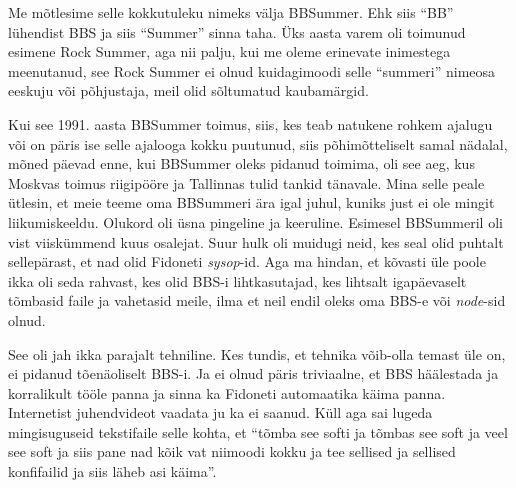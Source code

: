 Me mõtlesime selle kokkutuleku nimeks välja BBSummer. Ehk siis 
\enquote{BB} lühendist BBS ja siis \enquote{Summer} sinna taha. Üks aasta varem 
oli toimunud esimene Rock Summer, aga nii palju, kui me oleme erinevate inimestega 
meenutanud, see Rock Summer ei olnud kuidagimoodi selle \enquote{summeri} nimeosa 
eeskuju või põhjustaja, meil olid sõltumatud kaubamärgid. 

Kui see 1991. aasta BBSummer toimus, 
 siis, kes teab natukene rohkem ajalugu või 
on päris ise selle ajalooga kokku puutunud, siis põhimõtteliselt samal 
nädalal,  mõned päevad enne, kui BBSummer oleks pidanud toimima, oli see aeg, kus 
Moskvas toimus riigipööre ja Tallinnas tulid tankid tänavale. Mina selle peale ütlesin, et  meie teeme 
oma BBSummeri ära igal juhul, kuniks just ei ole mingit 
liikumiskeeldu. Olukord oli üsna pingeline ja keeruline. Esimesel BBSummeril 
oli vist viiskümmend kuus osalejat. Suur 
hulk oli muidugi neid, kes seal olid puhtalt  sellepärast, et nad olid Fidoneti 
\emph{sysop}-id. Aga ma hindan, et kõvasti üle poole ikka oli seda rahvast, kes  
olid BBS-i lihtkasutajad, kes lihtsalt igapäevaselt tõmbasid faile ja 
vahetasid meile, ilma et neil endil oleks oma BBS-e või \emph{node}-sid olnud.


See oli jah ikka parajalt tehniline. Kes tundis, et tehnika võib-olla temast 
üle on, ei pidanud tõenäoliselt BBS-i. Ja ei olnud päris triviaalne, et BBS 
häälestada ja korralikult tööle panna ja  sinna ka Fidoneti 
automaatika käima panna. Internetist juhendvideot vaadata ju ka ei saanud. Küll 
aga sai lugeda mingisuguseid tekstifaile  selle kohta, et \enquote{tõmba see 
softi ja tõmbas see soft ja veel see soft ja siis pane nad kõik vat niimoodi kokku ja  
tee sellised ja sellised konfifailid ja siis läheb asi käima}.

